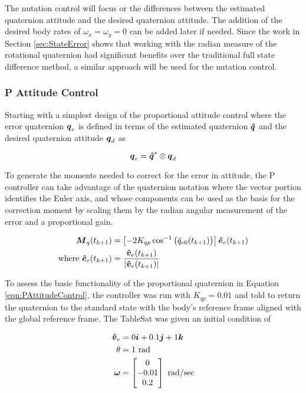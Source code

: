 The nutation control will focus or the differences between the estimated quaternion attitude and the desired quaternion attitude.  The addition of the desired body rates of $\omega_x = \omega_y = 0$ can be added later if needed.  Since the work in Section \ref{sec:StateError} shows that working with the radian measure of the rotational quaternion had significant benefits over the traditional full state difference method, a similar approach will be used for the nutation control.

\subsubsection{P Attitude Control}
\label{subsubsec:PAttitudeControl}

Starting with a simplest design of the proportional attitude control where the error quaternion $\boldsymbol{q}_e$ is defined in terms of the estimated quaternion $\boldsymbol{\hat{q}}$ and the desired quaternion attitude $\boldsymbol{q}_d$ as

\begin{equation}
  \boldsymbol{q}_e = \boldsymbol{\hat{q}}^* \otimes \boldsymbol{q}_d
\end{equation}

To generate the moments needed to correct for the error in attitude, the P controller can take advantage of the quaternion notation where the vector portion identifies the Euler axis, and whose components can be used as the basis for the correction moment by scaling them by the radian angular measurement of the error and a proportional gain.

\begin{subequations}
  \begin{align}
    \boldsymbol{M}_{q}(t_{k+1}) &= \left[-2 K_{qp} \cos^{-1} \big(\hat{q}_{e0}(t_{k+1}) \big) \right] \boldsymbol{\hat{e}}_e(t_{k+1}) \\
    \text{where } \boldsymbol{\hat{e}}_e(t_{k+1}) &= \frac{\boldsymbol{\hat{v}}_e(t_{k+1})}{|\boldsymbol{\hat{v}}_e(t_{k+1})|}
  \end{align}
  \label{eqn:PAttitudeControl}
\end{subequations}

To assess the basic functionality of the proportional quaternion in Equation \ref{eqn:PAttitudeControl}, the controller was run with $K_{qp} = 0.01$ and told to return the quaternion to the standard state with the body's reference frame aligned with the global reference frame.  The TableSat was given an initial condition of

\begin{subequations}
  \begin{align}
    \boldsymbol{\hat{v}}_e &= 0\boldsymbol{i}+0.1\boldsymbol{j}+1 \boldsymbol{k}\\
    \theta &= 1 \text{ rad} \\
    \boldsymbol{\omega} &= \begin{bmatrix} 0 \\ -0.01 \\ 0.2 \end{bmatrix} \text{ rad/sec}
  \end{align}
\end{subequations}

